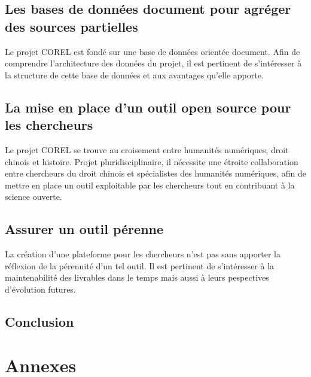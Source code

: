 \documentclass[a4paper,12pt,twoside]{book}
\newcommand{\COREL}{\gls{COREL}\xspace}
\newcommand{\clearemptydoublepage}{\newpage{\pagestyle{empty}\cleardoublepage}}
\newcommand\chapterNo[1]{
  \chapter*{#1}
  \markright{\MakeUppercase{#1}}
}
\begin{document}
    \chapter{Les bases de données document pour agréger des sources partielles}
    Le projet \COREL est fondé sur une base de données orientée document. Afin de comprendre l'architecture des données du projet, il est pertinent de s'intéresser à la structure de cette base de données et aux avantages qu'elle apporte.
                    
            
        \clearemptydoublepage
        
        \chapter{La mise en place d’un outil open source pour les chercheurs}
        Le projet \COREL se trouve au croisement entre humanités numériques, droit chinois et histoire. Projet pluridisciplinaire, il nécessite une étroite collaboration entre chercheurs du droit chinois et spécialistes des humanités numériques, afin de mettre en place un outil exploitable par les chercheurs tout en contribuant à la science ouverte.
                    
             
            
        \clearemptydoublepage
        
        \chapter{Assurer un outil pérenne}
        La création d'une plateforme pour les chercheurs n'est pas sans apporter la réflexion de la pérennité d'un tel outil. Il est pertinent de s'intéresser à la maintenabilité des livrables dans le temps mais aussi à leurs pespectives d'évolution futures. 
                    
             
            
        \clearemptydoublepage
    
    \chapterNo{Conclusion}
    \pagestyle{empty}
    

\appendix
    \part*{Annexes}	
    \pagestyle{empty}
    

\clearemptydoublepage

\backmatter
    \printacronyms[title=Liste des acronymes,toctitle=Acronymes]
    \listoffigures
    \printglossary 
    \printbibliography[keyword={institution}, title={Histoire des institutions}]
    \printbibliography[keyword={histoire}, title={Histoire du droit chinois}]
    \printbibliography[keyword={edition}, title={Édition scientifique numérique}]
    \tableofcontents
	
\end{document}
